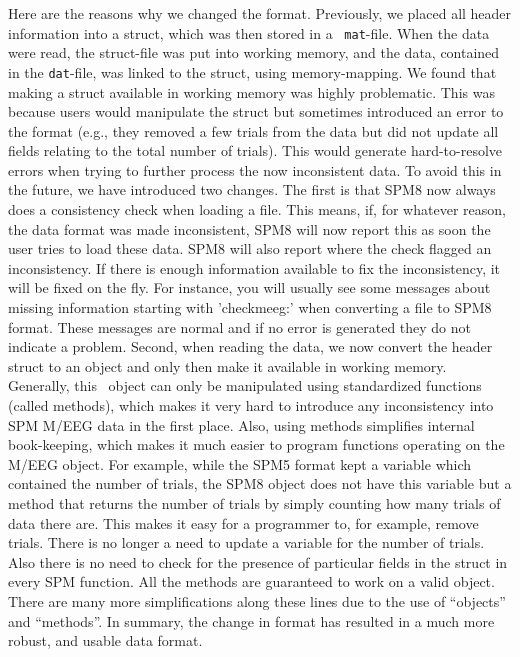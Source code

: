 Here are the reasons why we changed the format. Previously, we placed all header information into a struct, which was then stored in a \matlab\ \texttt{mat}-file. When the data were read, the struct-file was put into working memory, and the data, contained in the \texttt{dat}-file, was linked to the struct, using memory-mapping. We found that making a struct available in working memory was highly problematic. This was because users would manipulate the struct but sometimes introduced an error to the format (e.g., they removed a few trials from the data but did not update all fields relating to the total number of trials). This would generate hard-to-resolve errors when trying to further process the now inconsistent data. To avoid this in the future, we have introduced two changes. The first is that SPM8 now always does a consistency check when loading a file. This means, if, for whatever reason, the data format was made inconsistent, SPM8 will now report this as soon the user tries to load these data. SPM8 will also report where the check flagged an inconsistency. If there is enough information available to fix the inconsistency, it will be fixed on the fly. For instance, you will usually see some messages about missing information starting with 'checkmeeg:' when converting a file to SPM8 format. These messages are normal and if no error is generated they do not indicate a problem. Second, when reading the data, we now convert the header struct to an object and only then make it available in working memory. Generally, this \matlab\ object can only be manipulated using standardized functions (called methods), which makes it very hard to introduce any inconsistency into SPM M/EEG data in the first place. Also, using methods simplifies internal book-keeping, which makes it much easier to program functions operating on the M/EEG object. For example, while the SPM5 format kept a variable which contained the number of trials, the SPM8 object does not have this variable but a method that returns the number of trials by simply counting how many trials of data there are. This makes it easy for a programmer to, for example, remove trials. There is no longer a need to update a variable for the number of trials. Also there is no need to check for the presence of particular fields in the struct in every SPM function. All the methods are guaranteed to work on a valid object. There are many more simplifications along these lines due to the use of ``objects'' and ``methods''. In summary, the change in format has resulted in a much more robust, and usable data format.

